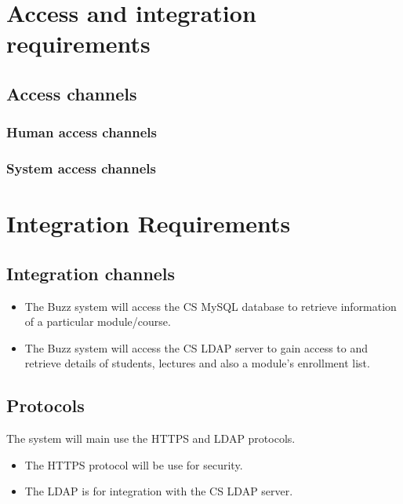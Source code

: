\documentclass[a4paper,12pt,titlepage]{article}
\begin{document}
\newpage
\setlength{\voffset}{-3cm}

\section{Access and integration requirements}
\subsection{Access channels}
\subsubsection{Human access channels} %
\subsubsection{System access channels}%

\section{Integration Requirements}
\subsection{Integration channels}
\begin{itemize}
\item The Buzz system will access the CS MySQL database to retrieve information of a particular module/course.
\item The Buzz system will access the CS LDAP server to gain access to and retrieve details of students,  lectures and also a module's enrollment  list.
\end{itemize}

\subsection{Protocols}
The system will main use the HTTPS and LDAP protocols.
\begin{itemize}
\item The HTTPS protocol will be use for security.
\item The LDAP is for integration with the CS LDAP server.  
\end{itemize}

\pagebreak
\end{document}
